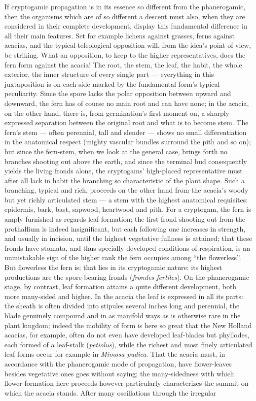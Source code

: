 \documentclass[12pt,a4paper]{book}
\begin{document}
If cryptogamic propagation is in its essence so different from the phanerogamic,
then the organisms which are of so different a descent must also, when they are
considered in their complete development, display this fundamental difference in
all their main features. Set for example lichens against grasses, ferns against
acacias, and the typical-teleological opposition will, from the idea's point of
view, be striking. What an opposition, to keep to the higher representatives, does
the fern form against the acacia! The root, the stem, the leaf, the habit, the
whole exterior, the inner structure of every single part --- everything in this
juxtaposition is on each side marked by the fundamental form's typical peculiarity.
Since the spore lacks the polar opposition between upward and downward, the fern
has of course no main root and can have none; in the acacia, on the other hand,
there is, from germination's first moment on, a sharply expressed separation
between the original root and what is to become stem. The fern's stem --- often
perennial, tall and slender --- shows no small differentiation in the anatomical
respect (mighty vascular bundles surround the pith
and so on); but since the fern-stem, when we look at the general case, brings
forth no branches shooting out above the earth, and since the terminal bud
consequently yields the living fronds alone, the cryptogams' high-placed
representative must after all lack in habit the branching so characteristic of the
plant shape. Such a branching, typical and rich, proceeds on the other hand from
the acacia's woody but yet richly articulated stem --- a stem with the highest
anatomical requisites: epidermis, bark, bast, sapwood, heartwood and pith. For a
cryptogam, the fern is amply furnished as regards leaf formation; the first frond
shooting out from the prothallium is indeed insignificant, but each following one
increases in strength, and usually in incision, until the highest vegetative
fullness is attained; that these fronds have stomata, and thus specially developed
conditions of respiration, is an unmistakable sign of the higher rank the fern
occupies among ``the flowerless''. But flowerless the fern is; that lies in its
cryptogamic nature: its highest productions are the spore-bearing fronds
(\textit{frondes fertiles}). On the phanerogamic stage, by contrast, leaf formation
attains a quite different development, both more many-sided and higher. In the
acacia the leaf is expressed in all its parts: the sheath is often divided into
stipules several inches long and perennial, the blade genuinely compound and in as
manifold ways as is otherwise rare in the plant kingdom; indeed the mobility of
form is here so great that the New Holland acacias, for example, often do not even
have developed leaf-blades but phyllodes, each formed of a leaf-stalk
(\textit{petiolus}), while the richest and most finely articulated leaf forms occur
for example in \textit{Mimosa pudica}. That the acacia must, in accordance with the
phanerogamic mode of propagation, have flower-leaves besides vegetative ones goes
without saying; the many-sidedness with which flower formation here proceeds
however particularly characterizes the summit on which the acacia stands. After
many oscillations through the irregular
\end{document}
